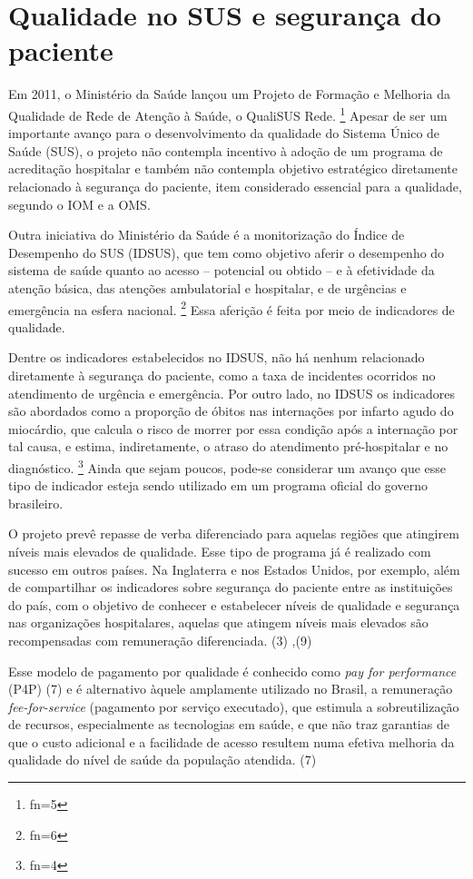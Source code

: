 \documentclass{article}
\makeatletter
\newcommand{\fn}{\afterassignment\fn@aux\count0=}
\newcommand{\fn@aux}{\csname fn\the\count0\endcsname}
\makeatother
\begin{document}
\section{Qualidade no SUS e segurança do paciente}

Em 2011, o Ministério da Saúde lançou um Projeto de Formação e Melhoria da
Qualidade de
Rede de Atenção à Saúde, o QualiSUS Rede. \footnote{\fn5}
Apesar de ser um importante avanço para o desenvolvimento da qualidade do
Sistema
Único de Saúde (SUS), o projeto não contempla incentivo à adoção de um programa
de
acreditação hospitalar e também não contempla objetivo estratégico diretamente
relacionado à
segurança do paciente, item considerado essencial para a qualidade, segundo o
IOM e a
OMS.

Outra iniciativa do Ministério da Saúde é a monitorização do Índice de
Desempenho do SUS
(IDSUS), que tem como objetivo aferir o desempenho do sistema de saúde quanto ao
acesso –
potencial ou obtido – e à efetividade da atenção básica, das atenções
ambulatorial e
hospitalar, e de urgências e emergência na esfera nacional. \footnote{\fn6}
Essa aferição é feita por meio de indicadores de qualidade.

Dentre os indicadores estabelecidos no IDSUS, não há nenhum relacionado
diretamente à
segurança do paciente, como a taxa de incidentes ocorridos no atendimento de
urgência e
emergência. Por outro lado, no IDSUS os indicadores são abordados como a
proporção de óbitos
nas internações por infarto agudo do miocárdio, que calcula o risco de morrer
por essa
condição após a internação por tal causa, e estima, indiretamente, o atraso do
atendimento
pré-hospitalar e no diagnóstico. \footnote{\fn4}
Ainda que sejam poucos, pode-se considerar um avanço que esse tipo de indicador
esteja sendo utilizado em um programa oficial do governo brasileiro.

O projeto prevê repasse de verba diferenciado para aquelas regiões que atingirem
níveis
mais elevados de qualidade. Esse tipo de programa já é realizado com sucesso em
outros
países. Na Inglaterra e nos Estados Unidos, por exemplo, além de compartilhar os
indicadores
sobre segurança do paciente entre as instituições do país, com o objetivo de
conhecer e
estabelecer níveis de qualidade e segurança nas organizações hospitalares,
aquelas que
atingem níveis mais elevados são recompensadas com remuneração diferenciada. (3)
,(9)

Esse modelo de pagamento por qualidade é conhecido como \textit{pay for
performance}
(P4P) (7)
e é alternativo àquele amplamente utilizado no Brasil, a remuneração
\textit{fee-for-service}
(pagamento por serviço executado), que estimula a
sobreutilização de recursos, especialmente as tecnologias em saúde, e que não
traz garantias
de que o custo adicional e a facilidade de acesso resultem numa efetiva melhoria
da
qualidade do nível de saúde da população atendida. (7)
\end{document}
